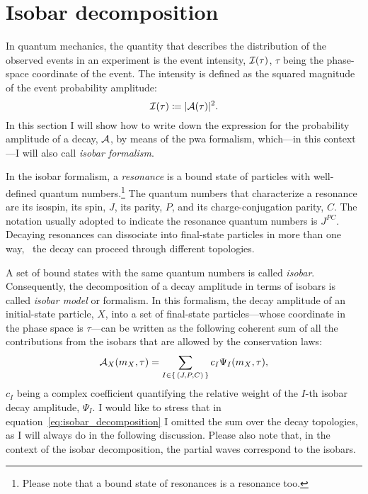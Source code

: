 \section{Isobar decomposition}

    In quantum mechanics, the quantity that describes the distribution of the observed events in an experiment is the event intensity, $\mathcal{I}(\tau)$, $\tau$ being the phase-space coordinate of the event.
    The intensity is defined as the squared magnitude of the event probability amplitude:
    \begin{equation}
        \mathcal{I}(\tau) \coloneqq \lvert\mathcal{A}(\tau)\rvert^2.
    \end{equation}
    In this section I will show how to write down the expression for the probability amplitude of a decay, $\mathcal{A}$, by means of the \ac{pwa} formalism, which---in this context---I will also call \emph{isobar formalism}.


    In the isobar formalism, a \emph{resonance} is a bound state of particles with well-defined quantum numbers.\footnote{Please note that a bound state of resonances is a resonance too.}
    The quantum numbers that characterize a resonance are its isospin, its spin, $J$, its parity, $P$, and its charge-conjugation parity, $C$.
    The notation usually adopted to indicate the resonance quantum numbers is $J^{PC}$.
    Decaying resonances can dissociate into final-state particles in more than one way, \ie~the decay can proceed through different topologies.


    A set of bound states with the same quantum numbers is called \emph{isobar}.
    Consequently, the decomposition of a decay amplitude in terms of isobars is called \emph{isobar model} or formalism.
    In this formalism, the decay amplitude of an initial-state particle, $X$, into a set of final-state particles---whose coordinate in the phase space is $\tau$---can be written as the following coherent sum of all the contributions from the isobars that are allowed by the conservation laws:
    \begin{equation}\label{eq:isobar_decomposition}
        \mathcal{A}_X(m_X,\tau) = \sum_{I\in\set{(J, P, C)}} c_I \Psi_I(m_X, \tau),
    \end{equation}
    $c_I$ being a complex coefficient quantifying the relative weight of the $I$-th isobar decay amplitude, $\Psi_I$.
    I would like to stress that in equation~\eqref{eq:isobar_decomposition} I omitted the sum over the decay topologies, as I will always do in the following discussion.
    Please also note that, in the context of the isobar decomposition, the partial waves correspond to the isobars.


